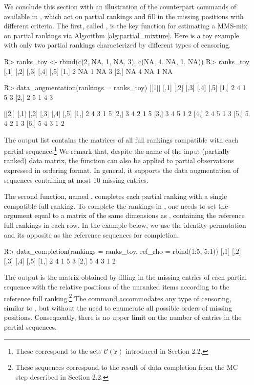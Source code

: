 We conclude this section with an illustration of the counterpart commands of  available in , which act on partial rankings and fill in the missing positions with different criteria.
The first, called , is the key function for estimating a MMS-mix on partial rankings via Algorithm \ref{alg:partial_mixture}. Here is a toy example with only two partial rankings characterized by different types of censoring.
\begin{example}
R> ranks_toy <- rbind(c(2, NA, 1, NA, 3), c(NA, 4, NA, 1, NA))
R> ranks_toy
     [,1] [,2] [,3] [,4] [,5]
[1,]    2   NA    1   NA    3
[2,]   NA    4   NA    1   NA

R> data_augmentation(rankings = ranks_toy)
[[1]]
     [,1] [,2] [,3] [,4] [,5]
[1,]    2    4    1    5    3
[2,]    2    5    1    4    3

[[2]]
     [,1] [,2] [,3] [,4] [,5]
[1,]    2    4    3    1    5
[2,]    3    4    2    1    5
[3,]    3    4    5    1    2
[4,]    2    4    5    1    3
[5,]    5    4    2    1    3
[6,]    5    4    3    1    2
\end{example}
The output list contains the matrices of all full rankings compatible with each partial sequence.\footnote{These correspond to the sets $\mathcal{C}(\bm r)$ introduced in Section 2.2.}
We remark that, despite the name  of the input (partially ranked) data matrix, the function  can also be applied to partial observations expressed in ordering format. In general, it supports the data augmentation of sequences containing at most 10 missing entries.

The second function, named , completes each partial ranking with a single compatible full ranking. To complete the rankings in , one needs to set the  argument equal to a matrix of the same dimensions as , containing the reference full rankings in each row. In the example below, we use the identity permutation and its opposite as the reference sequences for completion.
\begin{example}
R> data_completion(rankings = ranks_toy, ref_rho = rbind(1:5, 5:1))
     [,1] [,2] [,3] [,4] [,5]
[1,]    2    4    1    5    3
[2,]    5    4    3    1    2
\end{example}
The output is the matrix obtained by filling in the missing entries of each partial sequence with the relative positions of the unranked items according to the reference full ranking.\footnote{These sequences correspond to the result of data completion from the MC step described in Section
2.2.}
The  command accommodates any type of censoring, similar to , but without the need to enumerate all possible orders of missing positions. Consequently, there is no upper limit on the number of  entries in the partial sequences.


